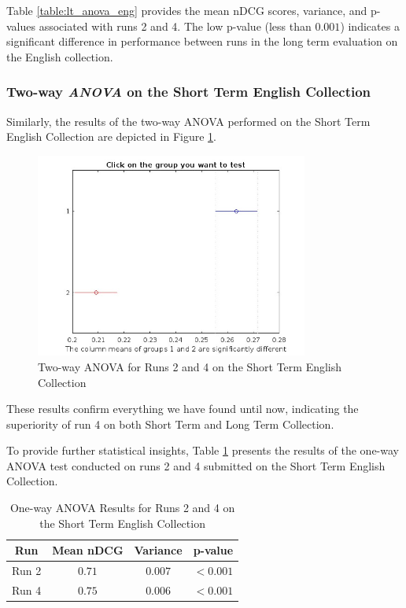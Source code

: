 Table \ref{table:lt_anova_eng} provides the mean \ac{nDCG} scores, variance, and p-values associated with runs 2 and 4. 
The low p-value (less than $0.001$) indicates a significant difference in performance between runs in the long term evaluation on the English collection.

\subsubsection{Two-way \textit{ANOVA} on the Short Term English Collection}

Similarly, the results of the two-way \ac{ANOVA} performed on the Short Term English Collection are depicted in Figure \ref{fig:st_anova_eng}.

\begin{figure}[!h]
\centering
\includegraphics[width=0.8\textwidth]{figure/StatisticalAnalysis/AnovaTwoWay/ST_EN.jpg}
\caption{Two-way ANOVA for Runs 2 and 4 on the Short Term English Collection}
\label{fig:st_anova_eng}
\end{figure}

These results confirm everything we have found until now, indicating the superiority of run 4 on both Short Term and Long Term Collection.

To provide further statistical insights, Table \ref{table:st_anova_eng} presents the results of the one-way \ac{ANOVA} test conducted on runs 2 and 4 submitted on the Short Term English Collection.

\begin{table}[htbp]
\centering
\caption{One-way \ac{ANOVA} Results for Runs 2 and 4 on the Short Term English Collection}
\label{table:st_anova_eng}
\begin{tabular}{cccc}
\toprule
\textbf{Run} & \textbf{Mean nDCG} & \textbf{Variance} & \textbf{p-value} \\
\midrule
Run 2 & $0.71$ & $0.007$ & $<0.001$ \\
Run 4 & $0.75$ & $0.006$ & $<0.001$ \\
\bottomrule
\end{tabular}
\end{table}

